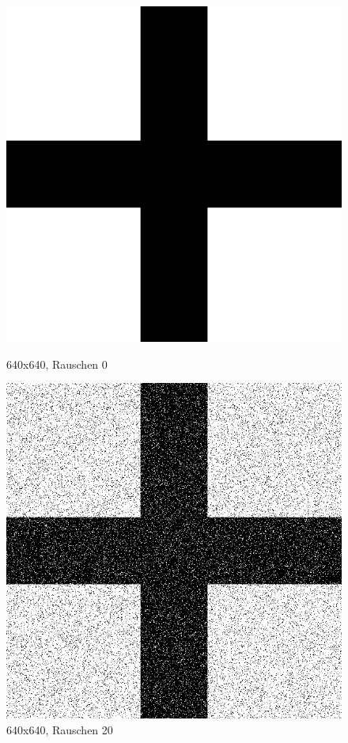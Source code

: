 \begin{figure}[hbt]
	\begin{minipage}{0.5 \textwidth}
		\includegraphics[width=\textwidth]{./Bilder/Auswertung/BeispielBilder/Picture_Crossing_noise_0_pixelCnt_128_featureCnt_5}
		\caption{640x640, Rauschen 0}
	\end{minipage}
	\hfill
	\begin{minipage}{0.5 \textwidth}
		\includegraphics[width=\textwidth]{./Bilder/Auswertung/BeispielBilder/Picture_Crossing_noise_20_pixelCnt_128_featureCnt_5}
		\caption{640x640, Rauschen 20}
	\end{minipage}
\end{figure}

